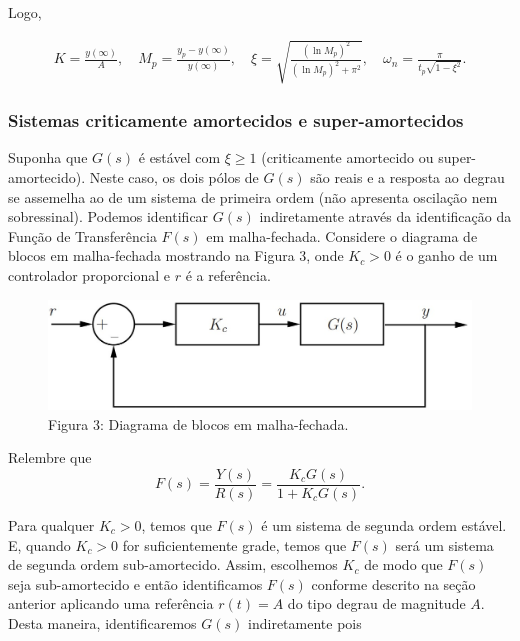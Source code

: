 \documentclass[
]{book}
\begin{document}
Logo,

\begin{align}
K = \frac {y(\infty)}{A}, \quad M_p = \frac {y_p - y(\infty)}{y(\infty)}, \quad \xi = \sqrt{\frac {(\ln{M_p})^2}{(\ln{M_p})^2+\pi^2}}, \quad \omega_n = \frac {\pi}{t_p\sqrt{1-\xi^2}}.  \label{eq:eq4}
\end{align}

\hypertarget{sistemas-criticamente-amortecidos-e-super-amortecidos}{%
\subsubsection{Sistemas criticamente amortecidos e super-amortecidos}\label{sistemas-criticamente-amortecidos-e-super-amortecidos}}

Suponha que \(G(s)\) é estável com \(\xi \geq 1\) (criticamente amortecido ou super-amortecido). Neste caso, os dois pólos de \(G(s)\) são reais e a resposta ao degrau se assemelha ao de um sistema de primeira ordem (não apresenta oscilação nem sobressinal). Podemos identificar \(G(s)\) indiretamente através da identificação da Função de Transferência \(F(s)\) em malha-fechada. Considere o diagrama de blocos em malha-fechada mostrando na Figura 3, onde \(K_c > 0\) é o ganho de um controlador proporcional e \(r\) é a referência.

\begin{figure}
\centering
\includegraphics{Imagens/Lab3/Explicação/fig3.jpg}
\caption{Figura 3: Diagrama de blocos em malha-fechada.}
\end{figure}

Relembre que
\[
F(s) = \frac {Y(s)}{R(s)} = \frac {K_cG(s)}{1+K_cG(s)}.
\]

Para qualquer \(K_c > 0\), temos que \(F(s)\) é um sistema de segunda ordem estável. E, quando \(K_c > 0\) for suficientemente grade, temos que \(F(s)\) será um sistema de segunda ordem sub-amortecido. Assim, escolhemos \(K_c\) de modo que \(F(s)\) seja sub-amortecido e então identificamos \(F(s)\) conforme descrito na seção anterior aplicando uma referência \(r(t) = A\) do tipo degrau de magnitude \(A\). Desta maneira, identificaremos \(G(s)\) indiretamente pois
\end{document}
